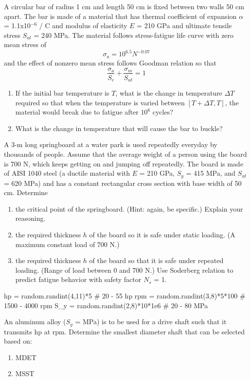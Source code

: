 \documentclass[
fontsize=10pt,
a4paper,
twosides=false,
open=any,
svgnames,
]{kaobook} %
\begin{document}
\begin{exercises}
  \item A circular bar of radius 1 cm and length 50 cm is fixed between two walls 50 cm apart. The bar is made of a material that has thermal coefficient of expansion $\alpha$ = 1.1x10$^{-6}$ / C and modulus of elasticity $E$ = 210 GPa and ultimate tensile stress $S_{ut}$ = 240 MPa. The material follows stress-fatigue life curve with zero mean stress of
  \[ \sigma_a = 10^{6.5}N^{-0.07} \]
  and the effect of nonzero mean stress follows Goodman relation so that
  \[ \frac{\sigma_a}{S_e} + \frac{\sigma_m}{S_{ut}} = 1 \]
  \begin{enumerate}
  \item If the initial bar temperature is $T$, what is the change in temperature $\Delta T$ required so that when the temperature is varied between $[T+\Delta T, T]$, the material would break due to fatigue after $10^6$ cycles?
  \item What is the change in temperature that will cause the bar to buckle?
  \end{enumerate}

  \item A 3-m long springboard at a water park is used repeatedly everyday by thousands of people. Assume that the average weight of a person using the board is 700 N, which keeps getting on and jumping off repeatedly. The board is made of AISI 1040 steel (a ductile material with $E$ = 210 GPa, $S_y$ = 415 MPa, and
  $S_{ut}$ = 620 MPa) and has a constant rectangular cross section with base width of 50 cm. Determine
  \begin{enumerate}
  \item the critical point of the springboard. (Hint: again, be specific.) Explain your reasoning.
  \item the required thickness $h$ of the board so it is safe under static loading. (A maximum constant load of 700 N.)
  \item the required thickness $h$ of the board so that it is safe under repeated loading. (Range of load between 0 and 700 N.) Use Soderberg relation to predict fatigue behavior with safety factor
    $N_s$ = 1.
  \end{enumerate}

\begin{pycode}
hp = random.randint(4,11)*5 # 20 - 55 hp
rpm = random.randint(3,8)*5*100 # 1500 - 4000 rpm
S_y = random.randint(2,8)*10*1e6 # 20 - 80 MPa
\end{pycode}

  \item An aluminum alloy ($S_{y}$ =  MPa) is to be used for a drive shaft such that it transmits  hp at  rpm. Determine the smallest diameter shaft that can be selected based on:
        \begin{enumerate}
          \item MDET
          \item MSST
        \end{enumerate}


\end{exercises}
\end{document}
